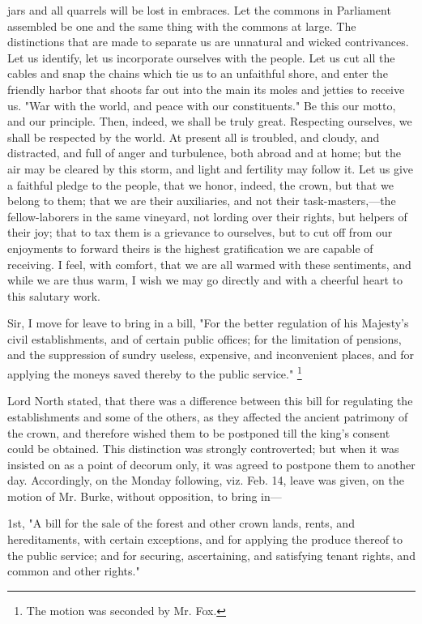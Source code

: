 jars and all quarrels will be lost in embraces. Let the commons in Parliament assembled be one and the same thing with the commons at large. The distinctions that are made to separate us are unnatural and wicked contrivances. Let us identify, let us incorporate ourselves with the people. Let us cut all the cables and snap the chains which tie us to an unfaithful shore, and enter the friendly harbor that shoots far out into the main its moles and jetties to receive us. "War with the world, and peace with our constituents." Be this our motto, and our principle. Then, indeed, we shall be truly great. Respecting ourselves, we shall be respected by the world. At present all is troubled, and cloudy, and distracted, and full of anger and turbulence, both abroad and at home; but the air may be cleared by this storm, and light and fertility may follow it. Let us give a faithful pledge to the people, that we honor, indeed, the crown, but that we belong to them; that we are their auxiliaries, and not their task-masters,—the fellow-laborers in the same vineyard, not lording over their rights, but helpers of their joy; that to tax them is a grievance to ourselves, but to cut off from our enjoyments to forward theirs is the highest gratification we are capable of receiving. I feel, with comfort, that we are all warmed with these sentiments, and while we are thus warm, I wish we may go directly and with a cheerful heart to this salutary work.

Sir, I move for leave to bring in a bill, "For the better regulation of his Majesty's civil establishments, and of certain public offices; for the limitation of pensions, and the suppression of sundry useless, expensive, and inconvenient places, and for applying the moneys saved thereby to the public service."
\footnote{ The motion was seconded by Mr. Fox.}


Lord North stated, that there was a difference between this bill for regulating the establishments and some of the others, as they affected the ancient patrimony of the crown, and therefore wished them to be postponed till the king's consent could be obtained. This distinction was strongly controverted; but when it was insisted on as a point of decorum only, it was agreed to postpone them to another day. Accordingly, on the Monday following, viz. Feb. 14, leave was given, on the motion of Mr. Burke, without opposition, to bring in—

1st, "A bill for the sale of the forest and other crown lands, rents, and hereditaments, with certain exceptions, and for applying the produce thereof to the public service; and for securing, ascertaining, and satisfying tenant rights, and common and other rights."


